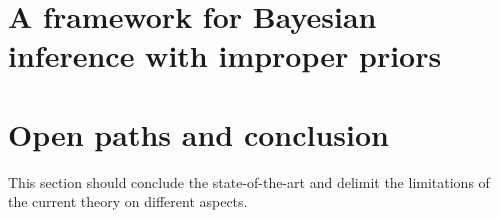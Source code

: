 
\section{A framework for Bayesian inference with improper priors}

\section{Open paths and conclusion}


This section should conclude the state-of-the-art and delimit the limitations of the current theory on different aspects. 












